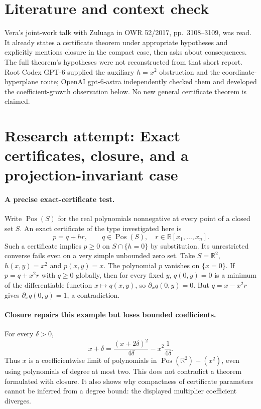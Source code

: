 \documentclass[11pt]{article}
\begin{document}
\section{Literature and context check}
Vera's joint-work talk with Zuluaga in OWR 52/2017, pp.~3108--3109, was read. It already states a certificate theorem under appropriate hypotheses and explicitly mentions closure in the compact case, then asks about consequences. The full theorem's hypotheses were not reconstructed from that short report. Root Codex GPT-6 supplied the auxiliary $h=x^2$ obstruction and the coordinate-hyperplane route; OpenAI gpt-6-astra independently checked them and developed the coefficient-growth observation below. No new general certificate theorem is claimed.
\section{Research attempt: Exact certificates, closure, and a projection-invariant case}

\paragraph{A precise exact-certificate test.}
Write $\operatorname{Pos}(S)$ for the real polynomials nonnegative at every point of a closed set $S$. An exact certificate of the type investigated here is
\[
 p=q+hr,\qquad q\in\operatorname{Pos}(S),\quad r\in\mathbb R[x_1,\ldots,x_n].
\]
Such a certificate implies $p\ge0$ on $S\cap\{h=0\}$ by substitution. Its unrestricted converse fails even on a very simple unbounded zero set. Take $S=\mathbb R^2$, $h(x,y)=x^2$ and $p(x,y)=x$. The polynomial $p$ vanishes on $\{x=0\}$. If $p=q+x^2r$ with $q\ge0$ globally, then for every fixed $y$, $q(0,y)=0$ is a minimum of the differentiable function $x\mapsto q(x,y)$, so $\partial_xq(0,y)=0$. But $q=x-x^2r$ gives $\partial_xq(0,y)=1$, a contradiction.

\paragraph{Closure repairs this example but loses bounded coefficients.}
For every $\delta>0$,
\[
 x+\delta=\frac{(x+2\delta)^2}{4\delta}-x^2\frac1{4\delta}.
\]
Thus $x$ is a coefficientwise limit of polynomials in $\operatorname{Pos}(\mathbb R^2)+(x^2)$, even using polynomials of degree at most two. This does not contradict a theorem formulated with closure. It also shows why compactness of certificate parameters cannot be inferred from a degree bound: the displayed multiplier coefficient diverges.
\end{document}
